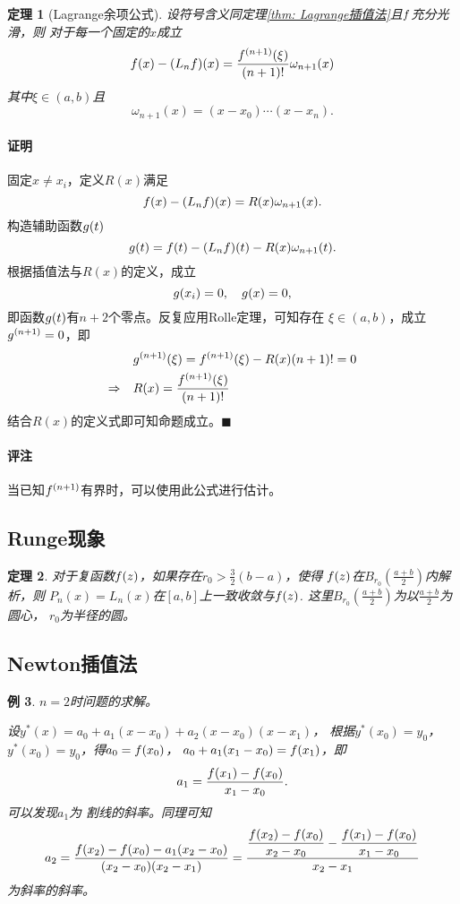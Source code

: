 \documentclass[12pt, a4paper]{article}
\theoremstyle{margin}
\newtheorem{thm}{定理}
\newtheorem{exa}[thm]{例}
\newcommand{\f}{\mathnormal{f}}
\newcommand{\g}{\mathnormal{g}}
\newcommand\thmref[1]{定理\ref{#1}}
\newcommand{\remark}{\paragraph{评注}}
\newcommand{\proof}{\paragraph{证明}}
\begin{document}
  \begin{thm}[Lagrange余项公式]
    设符号含义同\thmref{thm: Lagrange插值法}且$\f$充分光滑，则
    对于每一个固定的$x$成立
    \[
      \f(x) - (L_n\f)(x) =
      \frac{\f^{(n+1)}(\xi)}{(n+1)!}\omega_{n+1}(x)
    \]
    其中$\xi\in(a, b)$且
    \[
      \omega_{n+1}(x) = (x-x_0)\cdots(x-x_n).
    \]
  \end{thm}
  \proof
    固定$x\ne x_i$，定义$R(x)$满足
    \[
      \f(x) - (L_n\f)(x) = R(x)\omega_{n+1}(x).
    \]
    构造辅助函数$\g(t)$
    \[
      \g(t) = \f(t) - (L_n\f)(t) - R(x)\omega_{n+1}(t).
    \]
    根据插值法与$R(x)$的定义，成立
    \[
      \g(x_i) = 0,\quad g(x) = 0,
    \]
    即函数$\g(t)$有$n+2$个零点。反复应用Rolle定理，可知存在
    $\xi\in(a, b)$，成立$\g^{(n+1)} = 0$，即
    \[\begin{split}
      & \g^{(n+1)}(\xi) = \f^{(n+1)}(\xi) - R(x)(n+1)! = 0 \\
      \Rightarrow\quad& R(x) = \frac{\f^{(n+1)}(\xi)}{(n+1)!}
    \end{split}\]
    结合$R(x)$的定义式即可知命题成立。$\blacksquare$
  \remark
    当已知$\f^{(n+1)}$有界时，可以使用此公式进行估计。

\subsection{Runge现象}
  \begin{thm}
    对于复函数$\f(z)$，如果存在$r_0>\frac32(b-a)$，使得
    $\f(z)$在$B_{r_0}(\frac{a+b}{2})$内解析，则
    $P_n(x) = L_n(x)$在$[a, b]$上一致收敛与$\f(z)$.
    这里$B_{r_0}(\frac{a+b}{2})$为以$\frac{a+b}{2}$为圆心，
    $r_0$为半径的圆。
  \end{thm}

\subsection{Newton插值法}
  \begin{exa}
    $n=2$时问题的求解。\par
    设$y^*(x) = a_0 + a_1(x-x_0) + a_2(x-x_0)(x-x_1)$，
    根据$y^*(x_0) = y_0$，$y^*(x_0) = y_0$，得$a_0 = \f(x_0)$，
    $a_0 + a_1(x_1-x_0) = \f(x_1)$，即
    \[
      a_1 = \frac{\f(x_1)-\f(x_0)}{x_1 - x_0}.
    \]
    可以发现$a_1$为
    割线的斜率。同理可知
    \[
      a_2 = \frac{\f(x_2)-\f(x_0)-a_1(x_2-x_0)}{(x_2-x_0)(x_2-x_1)}
      = \frac{\dfrac{\f(x_2) - \f(x_0)}{x_2-x_0} - \dfrac{\f(x_1) - \f(x_0)}{x_1-x_0}}{x_2-x_1}
    \]
    为斜率的斜率。
  \end{exa}
\end{document}
